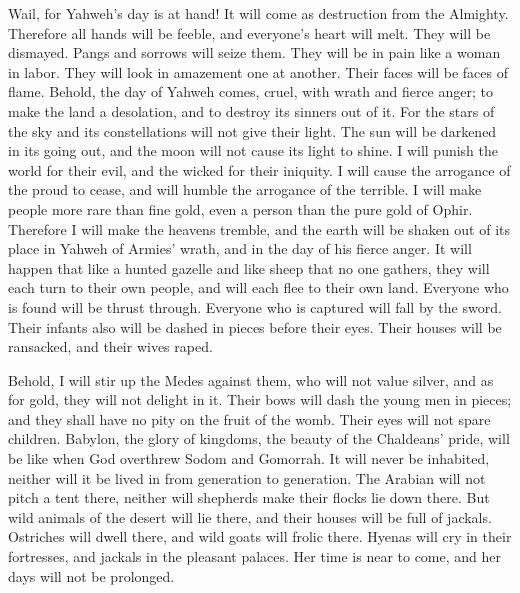  Wail, for Yahweh's day is at hand! It will come as
destruction from the Almighty.  Therefore all hands will
be feeble, and everyone's heart will melt.  They will be
dismayed. Pangs and sorrows will seize them. They will be in pain like a
woman in labor. They will look in amazement one at another. Their faces
will be faces of flame.  Behold, the day of Yahweh comes,
cruel, with wrath and fierce anger; to make the land a desolation, and
to destroy its sinners out of it.  For the stars of the
sky and its constellations will not give their light. The sun will be
darkened in its going out, and the moon will not cause its light to
shine.  I will punish the world for their evil, and the
wicked for their iniquity. I will cause the arrogance of the proud to
cease, and will humble the arrogance of the terrible.  I
will make people more rare than fine gold, even a person than the pure
gold of Ophir.  Therefore I will make the heavens
tremble, and the earth will be shaken out of its place in Yahweh of
Armies' wrath, and in the day of his fierce anger.  It
will happen that like a hunted gazelle and like sheep that no one
gathers, they will each turn to their own people, and will each flee to
their own land.  Everyone who is found will be thrust
through. Everyone who is captured will fall by the sword.
 Their infants also will be dashed in pieces before their
eyes. Their houses will be ransacked, and their wives raped.

 Behold, I will stir up the Medes against them, who will
not value silver, and as for gold, they will not delight in it.
 Their bows will dash the young men in pieces; and they
shall have no pity on the fruit of the womb. Their eyes will not spare
children.  Babylon, the glory of kingdoms, the beauty of
the Chaldeans' pride, will be like when God overthrew Sodom and
Gomorrah.  It will never be inhabited, neither will it be
lived in from generation to generation. The Arabian will not pitch a
tent there, neither will shepherds make their flocks lie down there.
 But wild animals of the desert will lie there, and their
houses will be full of jackals. Ostriches will dwell there, and wild
goats will frolic there.  Hyenas will cry in their
fortresses, and jackals in the pleasant palaces. Her time is near to
come, and her days will not be prolonged.

